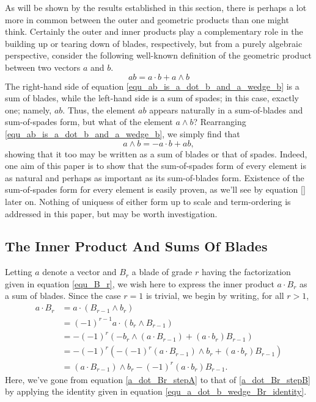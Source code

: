 \documentclass{birkjour}
\theoremstyle{definition}
\theoremstyle{remark}
\numberwithin{equation}{section}
\begin{document}
As will be shown by the results established in this section, there is perhaps a lot more in
common between the outer and geometric products than one might think.  Certainly the outer and
inner products play a complementary role in the building up or tearing down of blades, respectively, but from a
purely algebraic perspective, consider the following well-known definition of the geometric product
between two vectors $a$ and $b$.
\begin{equation}\label{equ_ab_is_a_dot_b_and_a_wedge_b}
ab = a\cdot b + a\wedge b
\end{equation}
The right-hand side of equation \eqref{equ_ab_is_a_dot_b_and_a_wedge_b} is a sum of blades, while the left-hand side is a sum of spades;
in this case, exactly one; namely, $ab$.  Thus, the element $ab$ appears naturally in a sum-of-blades and
sum-of-spades form, but what of the element $a\wedge b$?  Rearranging \eqref{equ_ab_is_a_dot_b_and_a_wedge_b}, we simply find that
\begin{equation}\label{equ_a_wedge_b_is_neg_a_dot_b_and_ab}
a\wedge b = -a\cdot b + ab,
\end{equation}
showing that it too may be written as a sum of blades or that of spades.  Indeed, one aim of this paper
is to show that the sum-of-spades form of every element is as natural and perhaps as important as its sum-of-blades form.
Existence of the sum-of-spades form for every element is easily proven, as we'll see by equation \eqref{} later on.  Nothing
of uniquess of either form up to scale and term-ordering is addressed in this paper, but may be worth investigation.

\subsection{The Inner Product And Sums Of Blades}

Letting $a$ denote a vector and $B_r$ a blade of grade $r$ having the factorization
given in equation \eqref{equ_B_r}, we wish here to express the inner product $a\cdot B_r$ as a sum of blades.
Since the case $r=1$ is trivial, we begin by writing, for all $r>1$,
\begin{align}
a\cdot B_r
 &= a\cdot(B_{r-1}\wedge b_r)\nonumber \\
 &= (-1)^{r-1}a\cdot(b_r\wedge B_{r-1})\label{a_dot_Br_stepA} \\
 &= -(-1)^r\left(-b_r\wedge(a\cdot B_{r-1})+(a\cdot b_r)B_{r-1}\right)\label{a_dot_Br_stepB} \\
 &= -(-1)^r\left(-(-1)^r(a\cdot B_{r-1})\wedge b_r+(a\cdot b_r)B_{r-1}\right)\nonumber \\
 &= (a\cdot B_{r-1})\wedge b_r - (-1)^r(a\cdot b_r)B_{r-1}.\label{equ_a_dot_Br_recursive}
\end{align}
Here, we've gone from equation \eqref{a_dot_Br_stepA} to that of \eqref{a_dot_Br_stepB} by
applying the identity given in equation \eqref{equ_a_dot_b_wedge_Br_identity}.
\end{document}

